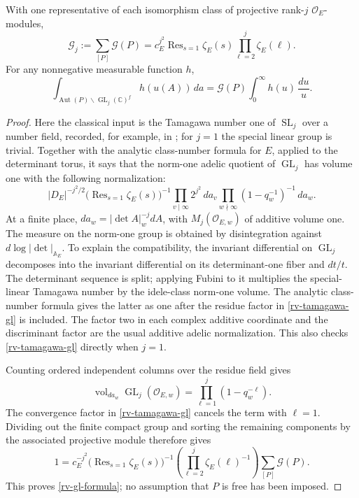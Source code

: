 \begin{lemma}\label{rv-gl-volume}
With one representative of each isomorphism class of
projective rank-$j$ $\mathcal O_E$-modules,
\begin{equation}\label{rv-gl-formula}
 \mathcal G_j:=\sum_{[P]}\mathcal G(P)
     =c_E^{j^2}\operatorname{Res}_{s=1}\zeta_E(s)
                         \prod_{\ell=2}^{j}\zeta_E(\ell).
\end{equation}
For any nonnegative measurable function $h$,
\begin{equation}\label{rv-gl-radial}
 \int_{\operatorname{Aut}(P)\backslash
                         \operatorname{GL}_j(\mathbb C)^f}
                  h(u(A))\,da
      =\mathcal G(P)\int_0^\infty h(u)\,\frac{du}{u}.
\end{equation}
\end{lemma}
\begin{proof}
Here the classical input is the Tamagawa number one of
$\operatorname{SL}_j$ over a number field, recorded, for
example, in \cite[\S57]{weil-siegel}; for $j=1$ the special
linear group is trivial.  Together with the analytic
class-number formula for $E$, applied to the determinant
torus, it says that the norm-one adelic quotient of
$\operatorname{GL}_j$ has volume one with the following
normalization:
\begin{equation}\label{rv-tamagawa-gl}
 |D_E|^{-j^2/2}
       \bigl(\operatorname{Res}_{s=1}\zeta_E(s)\bigr)^{-1}
       \prod_{v\mid\infty}2^{j^2}\,da_v
       \prod_{w\nmid\infty}(1-q_w^{-1})^{-1}\,da_w.
\end{equation}
At a finite place, $da_w=|\det A|_w^{-j}dA$, with
$M_j(\mathcal O_{E,w})$ of additive volume one.
The measure on the norm-one group is obtained by
disintegration against $d\log|\det|_{\mathbb A_E}$.
To explain the compatibility, the invariant differential
on $\operatorname{GL}_j$ decomposes into the invariant
differential on its determinant-one fiber and $dt/t$.
The determinant sequence is split; applying Fubini to it
multiplies the special-linear Tamagawa number by the
idele-class norm-one volume.  The analytic class-number
formula gives the latter as one after the residue factor
in \eqref{rv-tamagawa-gl} is included.  The factor two in
each complex additive coordinate and the discriminant
factor are the usual additive adelic normalization.
This also checks \eqref{rv-tamagawa-gl} directly when $j=1$.

Counting ordered independent columns over the residue
field gives
\[
 \operatorname{vol}_{da_w}\operatorname{GL}_j(\mathcal O_{E,w})
                 =\prod_{\ell=1}^{j}(1-q_w^{-\ell}).
\]
The convergence factor in \eqref{rv-tamagawa-gl} cancels
the term with $\ell=1$.  Dividing out the finite compact
group and sorting the remaining components by the
associated projective module therefore gives
\[
 1=c_E^{-j^2}
       \bigl(\operatorname{Res}_{s=1}\zeta_E(s)\bigr)^{-1}
       \left(\prod_{\ell=2}^{j}\zeta_E(\ell)^{-1}\right)
       \sum_{[P]}\mathcal G(P).
\]
This proves \eqref{rv-gl-formula}; no assumption that
$P$ is free has been imposed.


\end{proof}
